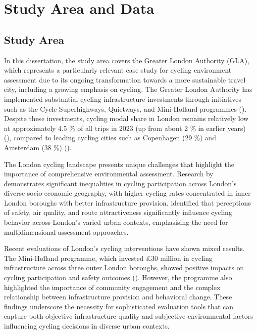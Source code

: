 \documentclass[
  12pt,
  oneside]{book}
\begin{document}
\chapter{Study Area and Data}\label{study-area-and-data}

\section{Study Area}\label{study-area}

In this dissertation, the study area covers the Greater London Authority (GLA), which represents a particularly relevant case study for cycling environment assessment due to its ongoing transformation towards a more sustainable travel city, including a growing emphasis on cycling. The Greater London Authority has implemented substantial cycling infrastructure investments through initiatives such as the Cycle Superhighways, Quietways, and Mini-Holland programmes (\textcite{tfl_cycling_action_2018}). Despite these investments, cycling modal share in London remains relatively low at approximately 4.5 \% of all trips in 2023 (up from about 2 \% in earlier years) (\textcite{tfl_active_travel_trends_2024}), compared to leading cycling cities such as Copenhagen (29 \%) and Amsterdam (38 \%) (\textcite{aldred_impacts_2019}).

The London cycling landscape presents unique challenges that highlight the importance of comprehensive environmental assessment. Research by \textcite{goodman_inequalities_2018} demonstrates significant inequalities in cycling participation across London's diverse socio-economic geography, with higher cycling rates concentrated in inner London boroughs with better infrastructure provision. \textcite{aldred_investigating_2015} identified that perceptions of safety, air quality, and route attractiveness significantly influence cycling behavior across London's varied urban contexts, emphasising the need for multidimensional assessment approaches.

Recent evaluations of London's cycling interventions have shown mixed results. The Mini-Holland programme, which invested £30 million in cycling infrastructure across three outer London boroughs, showed positive impacts on cycling participation and safety outcomes (\textcite{aldred_impacts_2019}). However, the programme also highlighted the importance of community engagement and the complex relationship between infrastructure provision and behavioral change. These findings underscore the necessity for sophisticated evaluation tools that can capture both objective infrastructure quality and subjective environmental factors influencing cycling decisions in diverse urban contexts.
\end{document}
